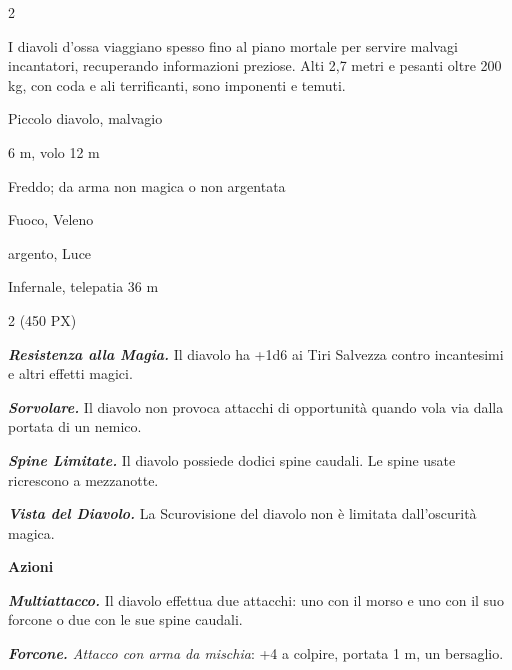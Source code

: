 \begin{multicols}{2}
{I diavoli d'ossa viaggiano spesso fino al piano mortale per servire malvagi incantatori, recuperando informazioni preziose. Alti 2,7 metri e pesanti oltre 200 kg, con coda e ali terrificanti, sono imponenti e temuti.

\begin{description}[noitemsep, topsep=0pt, parsep=0pt, partopsep=0pt, itemsep=1pt, leftmargin=2.35cm,  labelwidth=2.2cm, itemindent=0cm, listparindent=0pt] %
\setlength{\baselineskip}{10pt}
\item[\textbf{Taglia/Tipo}] Piccolo diavolo, malvagio
\item[\textbf{Caratt.}] 
\item[\textbf{Punti Ferita}] 
\item[\textbf{Movimento}] 6 m, volo 12 m
\item[\textbf{Tiri Salvez.}] 
\item[\textbf{Res. Danni}] Freddo; da arma non magica o non argentata
\item[\textbf{Imm. Danni}] Fuoco, Veleno
\item[\textbf{Vulnerabilità}] argento, Luce
\item[\textbf{Sensi}] 
\item[\textbf{Linguaggi}] Infernale, telepatia 36 m
\item[\textbf{Sfida}] 2 (450 PX)
\end{description}
\smallskip

\emph{\textbf{Resistenza alla Magia.}} Il diavolo ha +1d6 ai Tiri Salvezza contro incantesimi e altri effetti magici.

\emph{\textbf{Sorvolare.}} Il diavolo non provoca attacchi di opportunità quando vola via dalla portata di un nemico.

\emph{\textbf{Spine Limitate.}} Il diavolo possiede dodici spine caudali. Le spine usate ricrescono a mezzanotte.

\emph{\textbf{Vista del Diavolo.}} La Scurovisione del diavolo non è limitata dall'oscurità magica.

\textbf{Azioni}

\emph{\textbf{Multiattacco.}} Il diavolo effettua due attacchi: uno con il morso e uno con il suo forcone o due con le sue spine caudali.

\emph{\textbf{Forcone.} Attacco con arma da mischia}: +4 a colpire, portata 1 m, un bersaglio.

}
\end{multicols}
